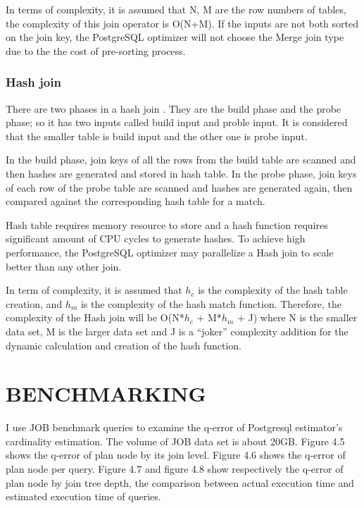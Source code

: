In terms of complexity, it is assumed that N, M are the row numbers of tables, the complexity of this join operator is O(N+M). If the inputs are not both sorted on the join key, the PostgreSQL optimizer will not choose the Merge join type due to the the cost of pre-sorting process.

\subsubsection{Hash join}

There are two phases in a hash join \cite{physical operators}. They are the build phase and the probe phase; so it has two inputs called build input and proble input. It is considered that the smaller table is build input and the other one is probe input.

In the build phase, join keys of all the rows from the build table are scanned and then hashes are generated and stored in hash table. In the probe phase, join keys of each row of the probe table are scanned and hashes are generated again, then compared against the corresponding hash table for a match.

Hash table requires memory resource to store and a hash function requires significant amount of CPU cycles to generate hashes. To achieve high performance, the PostgreSQL optimizer may parallelize a Hash join to scale better than any other join.

In term of complexity, it is assumed that $h_c$ is the complexity of the hash table creation, and $h_m$ is the complexity of the hash match function. Therefore, the complexity of the Hash join will be O(N*$h_c$ + M*$h_m$ + J) where N is the smaller data set, M is the larger data set and J is a “joker” complexity addition for the dynamic calculation and creation of the hash function.

\section{BENCHMARKING}

I use JOB benchmark queries to examine the q-error of Postgresql estimator's cardinality estimation. The volume of JOB data set is about 20GB. Figure 4.5 shows the q-error of plan node by its join level. Figure 4.6 shows the q-error of plan node per query. Figure 4.7 and figure 4.8 show respectively the q-error of plan node by join tree depth, the comparison between actual execution time and estimated execution time of queries.


